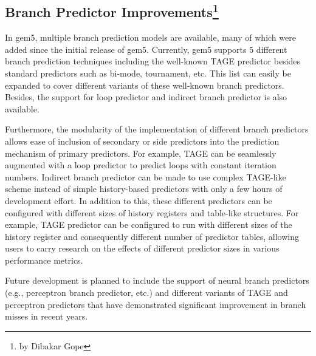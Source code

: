 \subsection[Branch Predictor Improvements]{Branch Predictor Improvements\footnote{by Dibakar Gope}}

In gem5, multiple branch prediction models are available, many of which were added since the initial release of gem5.
Currently, gem5 supports $5$ different branch prediction techniques including the well-known TAGE predictor besides standard predictors such as bi-mode, tournament, etc.
This list can easily be expanded to cover different variants of these well-known branch predictors.
Besides, the support for loop predictor and indirect branch predictor is also available.

Furthermore, the modularity of the implementation of different branch predictors allows ease of inclusion of secondary or side predictors into the prediction mechanism of primary predictors.
For example, TAGE can be seamlessly augmented with a loop predictor to predict loops with constant iteration numbers.
Indirect branch predictor can be made to use complex TAGE-like scheme instead of simple history-based predictors with only a few hours of development effort.
In addition to this, these different predictors can be configured with different sizes of history registers and table-like structures.
For example, TAGE predictor can be configured to run with different sizes of the history register and consequently different number of predictor tables, allowing users to carry research on the effects of different predictor sizes in various performance metrics.

Future development is planned to include the support of neural branch predictors (e.g., perceptron branch predictor, etc.) and different variants of TAGE and perceptron predictors that have demonstrated significant improvement in branch misses in recent years.
